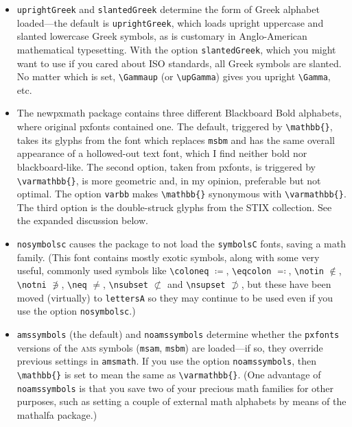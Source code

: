 \documentclass[11pt]{article}
\begin{document}
\begin{itemize}
\begin{verbatim}
\usepackage[cmintegrals]{newpxmath}
\end{verbatim}
you may use the forms \verb|\iint|, \verb|\iiint|, \verb|\iiiint| and \verb|\idotsint| defined in {\tt amsmath}, but using the pumped-up Computer Modern integral loaded by {\tt newpxmath}. 
\item {\tt uprightGreek} and {\tt slantedGreek} determine the form of Greek alphabet loaded---the default is {\tt uprightGreek}, which loads upright uppercase and slanted lowercase Greek symbols, as is customary in Anglo-American mathematical typesetting. With the option {\tt slantedGreek}, which you might want to use if you cared about ISO standards, all Greek symbols are slanted. No matter which is set, \verb|\Gammaup| (or \verb|\upGamma|) gives you upright \verb|\Gamma|, etc.
\item The \textsf{newpxmath} package contains three different Blackboard Bold alphabets, where original \textsf{pxfonts} contained one. The default, triggered by \verb|\mathbb{}|, takes its glyphs from the font which replaces {\tt msbm} and has the same overall appearance of a hollowed-out text font, which I find neither bold nor blackboard-like. The second option, taken from \textsf{pxfonts}, is triggered by \verb|\varmathbb{}|, is more geometric and, in my opinion, preferable but not optimal. The option {\tt varbb} makes \verb|\mathbb{}| synonymous with \verb|\varmathbb{}|. The third option is the double-struck glyphs from the STIX collection. See the expanded discussion below.
\item {\tt nosymbolsc} causes the package to not load the {\tt symbolsC} fonts, saving  a math family. (This font contains mostly exotic symbols, along with some very useful, commonly used symbols like \verb|\coloneq| $\coloneq$, \verb|\eqcolon| $\eqcolon$, \verb|\notin| $\notin$, \verb|\notni| $\notni$, \verb|\neq| $\neq$, \verb|\nsubset| $\nsubset$ and \verb|\nsupset| $\nsupset$, but these have been moved (virtually) to {\tt lettersA} so they may continue to be used even if you use the option {\tt nosymbolsc}.)
\item {\tt amssymbols} (the default) and {\tt noamssymbols} determine whether the {\tt pxfonts} versions of the \textsc{ams} symbols ({\tt msam}, {\tt msbm}) are loaded---if so, they override previous settings in {\tt amsmath}. If you use the option {\tt noamssymbols}, then \verb|\mathbb{}| is set to mean the same as \verb|\varmathbb{}|. (One advantage of {\tt noamssymbols} is that you save two of your precious math families for other purposes, such as setting a couple of external math alphabets by means of the \textsf{mathalfa} package.)
\end{itemize}
\end{document}
